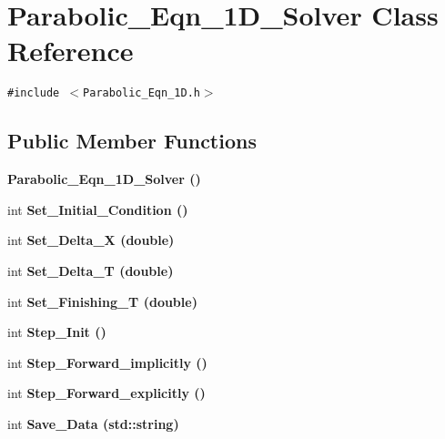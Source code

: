 \section{Parabolic\_\-Eqn\_\-1D\_\-Solver Class Reference}
\label{classParabolic__Eqn__1D__Solver}
{\tt \#include $<$Parabolic\_\-Eqn\_\-1D.h$>$}

\subsection*{Public Member Functions}
\begin{CompactItemize}
\item 
\bf{Parabolic\_\-Eqn\_\-1D\_\-Solver} ()
\item 
int \bf{Set\_\-Initial\_\-Condition} ()
\item 
int \bf{Set\_\-Delta\_\-X} (double)
\item 
int \bf{Set\_\-Delta\_\-T} (double)
\item 
int \bf{Set\_\-Finishing\_\-T} (double)
\item 
int \bf{Step\_\-Init} ()
\item 
int \bf{Step\_\-Forward\_\-implicitly} ()
\item 
int \bf{Step\_\-Forward\_\-explicitly} ()
\item 
int \bf{Save\_\-Data} (std::string)
\end{CompactItemize}
